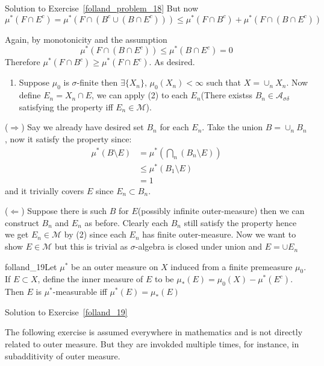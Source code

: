 \begin{mystsolution}{Solution to Exercise~\ref{folland_problem_18}}
But now
\begin{equation}
\mu^*(F\cap E^c) = \mu^*(F\cap (B^c \cup (B\cap E^c))) \leq \mu^*(F\cap B^c)  + \mu^*(F\cap (B\cap E^c))
\end{equation}

Again, by monotonicity and the assumption
\begin{equation}
\mu^*(F\cap (B\cap E^c))\leq \mu^*(B\cap E^c) = 0
\end{equation}
Therefore
$\mu^*(F \cap B^c) \geq  \mu^*(F\cap E^c)$. As desired.

\begin{enumerate}[resume]
\item Suppose $\mu_0$ is $\sigma$-finite then $\exists \{X_n\}$, $\mu_0(X_n)<\infty$ such that $X = \cup_n X_n$. Now define $E_n= X_n\cap E$, we can apply (2) to each $E_n$(There existss $B_n\in \mathcal A_{\sigma\delta}$ satisfying the property iff $E_n\in \mathcal M$).
\end{enumerate}

($\Longrightarrow$)  Say we already have desired set $B_n$ for each $E_n$. Take the union $B=\cup_n B_n$, now it satisfy the property since:
\begin{equation}
\begin{aligned}
\mu^*(B\setminus E) &=\mu^*(\bigcap_n (B_n \setminus E))  \\
&\leq \mu^*(B_1\setminus E) \\
&=1
\end{aligned}
\end{equation}
and it trivially covers $E$ since $E_n \subset B_n$.

($\Longleftarrow$) Suppose there is such $B$ for $E$(possibly infinite outer-measure) then we can construct $B_n$ and $E_n$ as before. Clearly each $B_n$ still satisfy the property hence we get $E_n \in \mathcal M$ by (2) since each $E_n$ has finite outer-measure. Now we want to show $E \in \mathcal M$ but this is trivial as $\sigma$-algebra is closed under union and $E= \cup E_n$

\end{mystsolution}
\begin{mystexercise}{}{folland_19}\label{folland_19}Let $\mu^*$ be an outer measure on $X$ induced from a finite premeasure $\mu_0$. If $E \subset X$, define the inner measure of $E$ to be $\mu_*(E) = \mu_0(X) - \mu^*(E^c)$. Then $E$ is $\mu^*$-measurable iff $\mu^*(E) = \mu_*(E)$

\end{mystexercise}
\begin{mystsolution}{Solution to Exercise~\ref{folland_19}}\end{mystsolution}
The following exercise is assumed everywhere in mathematics and is not directly related to outer measure. But they are invokded multiple times, for instance, in subadditivity of outer measure.

